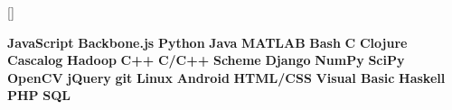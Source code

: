 
\titleformat{\section}{\Large\scshape\raggedright\sffamily}{}{0em}{}[\titlerule]

\setlength{\parindent}{0pt}

\newcommand{\skill}{\textbf}
\newcommand{\institution}{\textsc}

\def\div{\,\textbar{}\,}

\usepackage{xspace}


\newcommand{\lang}[2]{\expandafter\def\csname #1\endcsname{\skill{#2}\xspace}}

\lang{js}{JavaScript}
\lang{backbone}{Backbone.js}
\lang{python}{Python}
\lang{java}{Java}
\lang{matlab}{MATLAB}
\lang{bash}{Bash}
\lang{c}{C}
\lang{clojure}{Clojure}
\lang{cascalog}{Cascalog}
\lang{hadoop}{Hadoop}
\lang{cpp}{C++}
\lang{ccpp}{C/C++}
\lang{scheme}{Scheme}
\lang{django}{Django}
\lang{numpy}{NumPy}
\lang{scipy}{SciPy}
\lang{opencv}{OpenCV}
\lang{jquery}{jQuery}
\lang{git}{git}
\lang{linux}{Linux}
\lang{android}{Android}
\lang{html}{HTML/CSS}
\lang{visb}{Visual Basic}
\lang{haskell}{Haskell}
\lang{php}{PHP}
\lang{sql}{SQL}
